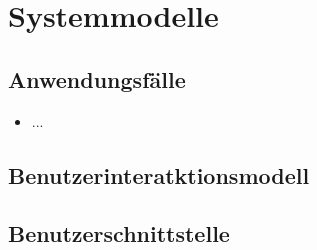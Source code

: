 \chapter{Systemmodelle}


\section{Anwendungsfälle}

\begin{itemize}

	\item ...
	
%		
%			
%			

	


\end{itemize}


\section{Benutzerinteratktionsmodell}


\section{Benutzerschnittstelle}